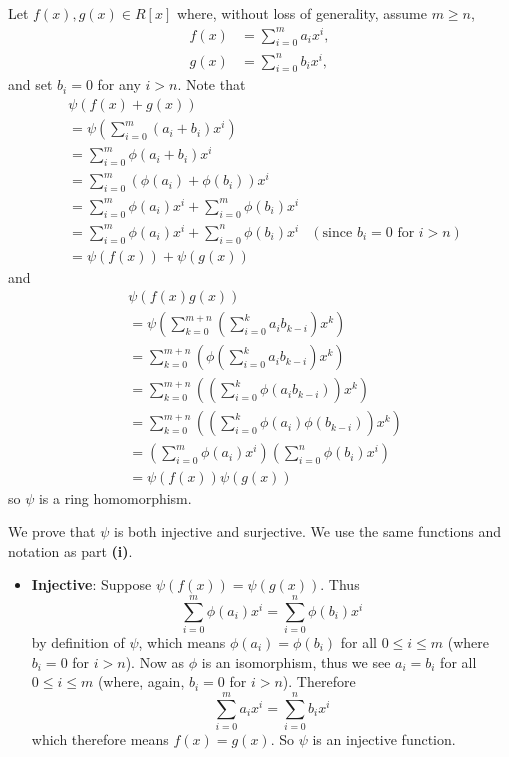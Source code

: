 \begin{questions}
    \item \begin{partquestions}{\roman*}
        \item Let $f(x), g(x) \in R[x]$ where, without loss of generality, assume $m \geq n$,
        \begin{align*}
            f(x) &= \sum_{i=0}^m a_ix^i,\\
            g(x) &= \sum_{i=0}^n b_ix^i,
        \end{align*}
        and set $b_i = 0$ for any $i > n$. Note that
        \begin{align*}
            &\psi(f(x) + g(x))\\
            &= \psi\left(\sum_{i=0}^m(a_i+b_i)x^i\right)\\
            &= \sum_{i=0}^m\phi(a_i + b_i)x^i\\
            &= \sum_{i=0}^m\left(\phi(a_i) + \phi(b_i)\right)x^i\\
            &= \sum_{i=0}^m\phi(a_i)x^i + \sum_{i=0}^m\phi(b_i)x^i\\
            &= \sum_{i=0}^m\phi(a_i)x^i + \sum_{i=0}^n\phi(b_i)x^i & (\text{since } b_i = 0 \text{ for } i > n)\\
            &= \psi(f(x)) + \psi(g(x))
        \end{align*}
        and
        \begin{align*}
            &\psi(f(x)g(x))\\
            &= \psi\left(\sum_{k=0}^{m+n}\left(\sum_{i=0}^ka_ib_{k-i}\right)x^k\right)\\
            &= \sum_{k=0}^{m+n}\left(\phi\left(\sum_{i=0}^ka_ib_{k-i}\right)x^k\right)\\
            &= \sum_{k=0}^{m+n}\left(\left(\sum_{i=0}^k\phi(a_ib_{k-i})\right)x^k\right)\\
            &= \sum_{k=0}^{m+n}\left(\left(\sum_{i=0}^k\phi(a_i)\phi(b_{k-i})\right)x^k\right)\\
            &= \left(\sum_{i=0}^m\phi(a_i)x^i\right)\left(\sum_{i=0}^n\phi(b_i)x^i\right)\\
            &= \psi(f(x))\psi(g(x))
        \end{align*}
        so $\psi$ is a ring homomorphism.

        \item We prove that $\psi$ is both injective and surjective. We use the same functions and notation as part \textbf{(i)}.
        \begin{itemize}
            \item \textbf{Injective}: Suppose $\psi(f(x)) = \psi(g(x))$. Thus
            \[
                \sum_{i=0}^m \phi(a_i)x^i = \sum_{i=0}^n \phi(b_i)x^i
            \]
            by definition of $\psi$, which means $\phi(a_i) = \phi(b_i)$ for all $0 \leq i \leq m$ (where $b_i = 0$ for $i > n$). Now as $\phi$ is an isomorphism, thus we see $a_i = b_i$ for all $0 \leq i \leq m$ (where, again, $b_i = 0$ for $i > n$). Therefore
            \[
                \sum_{i=0}^m a_ix^i = \sum_{i=0}^n b_ix^i
            \]
            which therefore means $f(x) = g(x)$. So $\psi$ is an injective function.


\end{itemize}
\end{partquestions}
\end{questions}
